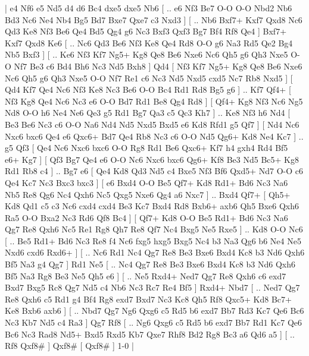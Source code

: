 \makegametitle 
|   e4   Nf6    e5   Nd5    d4   d6    Bc4   dxe5    dxe5   Nb6 [ .. e6  Nf3 Be7  O-O O-O  Nbd2 Nb6  Bd3 Nc6  Ne4 Nb4  Bg5 Bd7  Bxe7 Qxe7  c3 Nxd3   ]  [ .. Nb6  Bxf7+ Kxf7  Qxd8 Nc6  Qd3 Ke8  Nf3 Be6  Qe4 Bd5  Qg4 g6  Nc3 Bxf3  Qxf3 Bg7  Bf4 Rf8  Qe4   ]  Bxf7+   Kxf7   Qxd8   Ke6 [ .. Nc6  Qd3 Be6  Nf3 Ke8  Qe4 Rd8  O-O g6  Na3 Rd5  Qe2 Bg4  Nb5 Bxf3   ]  [ .. Ke6  Nf3 Kf7  Ng5+ Kg8  Qe8 Be6  Nxe6 Nc6  Qh5 g6  Qh3 Nxe5  O-O Nf7  Be3 c6  Bd4 Bh6  Nc3 Nd5  Bxh8   ]  Qd4 [  Nf3 Kf7  Ng5+ Kg8  Qe8 Be6  Nxe6 Nc6  Qh5 g6  Qh3 Nxe5  O-O Nf7  Re1 c6  Nc3 Nd5  Nxd5 cxd5  Nc7 Rb8  Nxd5   ]  [  Qd4 Kf7  Qe4 Nc6  Nf3 Ke8  Nc3 Be6  O-O Bc4  Rd1 Rd8  Bg5 g6   ] .. Kf7    Qf4+ [  Nf3 Kg8  Qe4 Nc6  Nc3 e6  O-O Bd7  Rd1 Be8  Qg4 Rd8   ]  [  Qf4+ Kg8  Nf3 Nc6  Ng5 Nd8  O-O h6  Ne4 Ne6  Qe3 g5  Rd1 Bg7  Qa3 c5  Qc3 Kh7   ] .. Ke8    Nf3   h6    Nd4 [  Be3 Be6  Nc3 c6  O-O Na6  Nd4 Nd5  Nxd5 Bxd5  e6 Kd8  Rfd1 g5  Qf7   ]  [  Nd4 Nc6  Nxc6 bxc6  Qe4 e6  Qxc6+ Bd7  Qe4 Rb8  Nc3 c6  O-O Nd5  Qg6+ Kd8  Ne4 Kc7   ] .. g5    Qf3 [  Qe4 Nc6  Nxc6 bxc6  O-O Rg8  Rd1 Be6  Qxc6+ Kf7  h4 gxh4  Rd4 Bf5  e6+ Kg7   ]  [  Qf3 Bg7  Qe4 e6  O-O Nc6  Nxc6 bxc6  Qg6+ Kf8  Be3 Nd5  Bc5+ Kg8  Rd1 Rb8  c4   ] .. Bg7    e6 [  Qe4 Kd8  Qd3 Nd5  c4 Bxe5  Nf3 Bf6  Qxd5+ Nd7  O-O c6  Qe4 Kc7  Nc3 Bxc3  bxc3   ]  [  e6 Bxd4  O-O Be5  Qf7+ Kd8  Rd1+ Bd6  Nc3 Na6  Nb5 Re8  Qg6 Nc4  Qxh6 Nc5  Qxg5 Nxe6  Qg4 a6  Nxc7   ] .. Bxd4    Qf7+ [  Qh5+ Kd8  Qd1 c5  c3 Nc6  cxd4 cxd4  Be3 Kc7  Bxd4 Rd8  Bxb6+ axb6  Qh5 Bxe6  Qxh6 Ra5  O-O Bxa2  Nc3 Rd6  Qf8 Bc4   ]  [  Qf7+ Kd8  O-O Be5  Rd1+ Bd6  Nc3 Na6  Qg7 Re8  Qxh6 Nc5  Re1 Rg8  Qh7 Re8  Qf7 Nc4  Bxg5 Ne5  Rxe5   ] .. Kd8   O-O   Nc6 [ .. Be5  Rd1+ Bd6  Nc3 Re8  f4 Nc6  fxg5 hxg5  Bxg5 Nc4  b3 Na3  Qg6 b6  Ne4 Ne5  Nxd6 cxd6  Rxd6+   ]  [ .. Nc6  Rd1 Nc4  Qg7 Re8  Be3 Bxe6  Bxd4 Kc8  b3 Nd6  Qxh6 Bf5  Na3 g4  Qg7   ]  Rd1   Ne5 [ .. Nc4  Qg7 Re8  Be3 Bxe6  Bxd4 Kc8  b3 Nd6  Qxh6 Bf5  Na3 Rg8  Be3 Ne5  Qh5 e6   ]  [ .. Ne5  Rxd4+ Ned7  Qg7 Re8  Qxh6 c6  exd7 Bxd7  Bxg5 Rc8  Qg7 Nd5  c4 Nb6  Nc3 Rc7  Re4 Bf5   ]  Rxd4+   Nbd7 [ .. Ned7  Qg7 Re8  Qxh6 c5  Rd1 g4  Bf4 Rg8  exd7 Bxd7  Nc3 Kc8  Qh5 Rf8  Qxc5+ Kd8  Bc7+ Ke8  Bxb6 axb6   ]  [ .. Nbd7  Qg7 Ng6  Qxg6 c5  Rd5 b6  exd7 Bb7  Rd3 Kc7  Qe6 Bc6  Nc3 Kb7  Nd5 c4  Ra3   ]  Qg7   Rf8 [ .. Ng6  Qxg6 c5  Rd5 b6  exd7 Bb7  Rd1 Kc7  Qe6 Bc6  Nc3 Rad8  Nd5+ Bxd5  Rxd5 Kb7  Qxe7 Rhf8  Bd2 Rg8  Bc3 a6  Qd6 a5   ]  [ .. Rf8  Qxf8#   ]  Qxf8#    [  Qxf8#   ] 1-0  |
